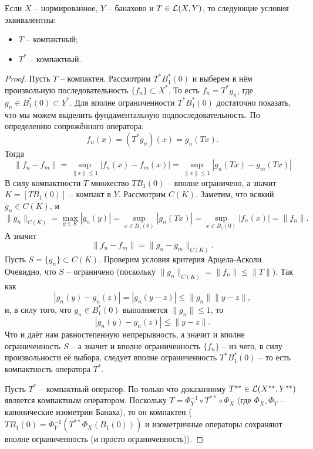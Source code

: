 \begin{proposition}\label{prop:shauder-theorem}
    Если $X$ -- нормированное, $Y$ -- банахово и $T \in \mathcal{L}(X, Y)$, то следующие условия эквивалентны:
    \begin{itemize}
        \item $T$ -- компактный;
        \item $T^*$ -- компактный.
    \end{itemize}
\end{proposition}
\begin{proof}
    Пусть $T$ -- компактен.
    Рассмотрим $T^* B_1^*(0)$ и выберем в нём произвольную последовательность $\{f_n\} \subset X^*$.
    То есть $f_n = T^* g_n$, где $g_n \in B_1^*(0) \subset Y^*$.
    Для вполне ограниченности $T^* B_1^*(0)$ достаточно показать, что мы можем выделить фундаментальную подпоследовательность.
    По определению сопряжённого оператора:
    \[
        f_n(x) = (T^* g_n)(x) = g_n(Tx).
    \]
    Тогда
    \[
        \|f_n - f_m\| = \sup_{\|x\| \leq 1} |f_n(x) - f_m(x)| = \sup_{\|x\| \leq 1}|g_n(Tx) - g_m(Tx)|
    \]
    В силу компактности $T$ множество $TB_1(0)$ -- вполне ограничено, а значит $K = [TB_1(0)]$ -- компакт в $Y$.
    Рассмотрим $C(K)$.
    Заметим, что всякий $g_n \in C(K)$, и
    \[
        \|g_n\|_{C(K)} = \max_{y \in K}|g_n(y)| = \sup_{x \in B_1(0)} |g_n(Tx)| = \sup_{x \in B_1(0)}|f_n(x)| = \|f_n\|.
    \]
    А значит
    \[
        \|f_n - f_m\| = \|g_n - g_m\|_{C(K)}.
    \]
    Пусть $S = \{g_n\} \subset C(K)$.
    Проверим условия критерия Арцела-Асколи.
    Очевидно, что $S$ -- ограничено (поскольку $\|g_n\|_{C(K)} = \|f_n\| \leq \|T\|$).
    Так как
    \[
        |g_n(y) - g_n(z)| = |g_n(y - z)| \leq \|g_n\| \|y - z\|,
    \]
    и, в силу того, что $g_n \in B_1^*(0)$ выполняется $\|g_n\| \leq 1$, то
    \[
        |g_n(y) - g_n(z)| \leq \|y - z\|.
    \]
    Что и даёт нам равностепенную непрерывность, а значит и вполне ограниченность $S$ -- а значит и вполне ограниченность $\{f_n\}$ -- из чего, в силу произвольности её выбора, следует вполне ограниченность $T^* B_1^*(0)$ -- то есть компактность оператора $T^*$.

    Пусть $T^*$ -- компактный оператор.
    По только что доказанному $T^{**} \in \mathcal{L}(X^{**}, Y^{**})$ является компактным оператором.
    Поскольку $T = \Phi_Y^{-1} \circ T^{**} \circ \Phi_X$ (где $\Phi_X, \Phi_Y$ -- канонические изометрии Банаха), то он компактен ($TB_1(0) = \Phi_Y^{-1}(T^{**}\Phi_X(B_1(0)))$ и изометричные операторы сохраняют вполне ограниченность (и просто ограниченность)).
\end{proof}
